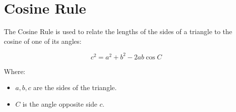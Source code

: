 \documentclass{article}
\begin{document}
\section*{Cosine Rule}

The Cosine Rule is used to relate the lengths of the sides of a triangle to the cosine of one of its angles:

\[
c^2 = a^2 + b^2 - 2ab\cos C
\]

Where:
\begin{itemize}
    \item \(a, b, c\) are the sides of the triangle.
    \item \(C\) is the angle opposite side \(c\).
\end{itemize}
\end{document}
